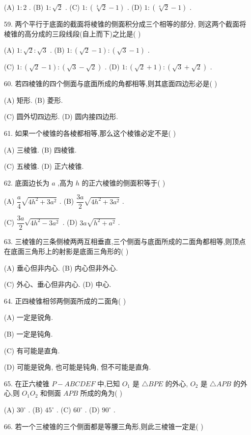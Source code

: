 (A) $1 : 2$ . (B) $1 : \sqrt{2}$ . (C) $1 : \left( {\sqrt[3]{2} - 1}\right)$ . (D) $1 : \left( {\sqrt[4]{2} - 1}\right)$ .

59. 两个平行于底面的截面将棱锥的侧面积分成三个相等的部分, 则这两个截面将棱锥的高分成的三段线段(自上而下)之比是(   )

(A) $1 : \sqrt{2} : \sqrt{3}$ . (B) $1 : \left( {\sqrt{2} - 1}\right)  : \left( {\sqrt{3} - 1}\right)$ .

(C) $1 : \left( {\sqrt{2} - 1}\right)  : \left( {\sqrt{3} - \sqrt{2}}\right)$ . (D) $1 : \left( {\sqrt{2} + 1}\right)  : \left( {\sqrt{3} + \sqrt{2}}\right)$ .

60. 若四棱锥的四个侧面与底面所成的角都相等,则其底面四边形必是(   )

(A) 矩形. (B) 菱形.

(C) 圆外切四边形. (D) 圆内接四边形.

61. 如果一个棱锥的各棱都相等,那么这个棱锥必定不是(   )

(A) 三棱锥. (B) 四棱锥.

(C) 五棱锥. (D) 正六棱锥.

62. 底面边长为 $a$ ,高为 $h$ 的正六棱锥的侧面积等于(   )

(A) $\dfrac{a}{4}\sqrt{4{h}^{2} + 3{a}^{2}}$ . (B) $\dfrac{3a}{2}\sqrt{4{h}^{2} + 3{a}^{2}}$ .

(C) $\dfrac{3a}{2}\sqrt{4{h}^{2} - 3{a}^{2}}$ . (D) ${3a}\sqrt{{h}^{2} + {a}^{2}}$ .

63. 三棱锥的三条侧棱两两互相垂直,三个侧面与底面所成的二面角都相等,则顶点在底面三角形上的射影是底面三角形的(   )

(A) 垂心但非内心. (B) 内心但非外心.

(C) 外心、垂心但非内心. (D) 中心.

64. 正四棱锥相邻两侧面所成的二面角(   )

(A) 一定是锐角.

(B) 一定是钝角.

(C) 有可能是直角.

(D) 可能是锐角, 也可能是钝角, 但不可能是直角.

65. 在正六棱锥 $P - {ABCDEF}$ 中,已知 ${O}_{1}$ 是 $\bigtriangleup {BPE}$ 的外心, ${O}_{2}$ 是 $\bigtriangleup {APB}$ 的外心,则 ${O}_{1}{O}_{2}$ 和侧面 ${APB}$ 所成的角为(   )

(A) ${30}^{ \circ  }$ . (B) ${45}^{ \circ  }$ . (C) ${60}^{ \circ  }$ . (D) ${90}^{ \circ  }$ .

66. 若一个三棱锥的三个侧面都是等腰三角形,则此三棱锥一定是(   )

